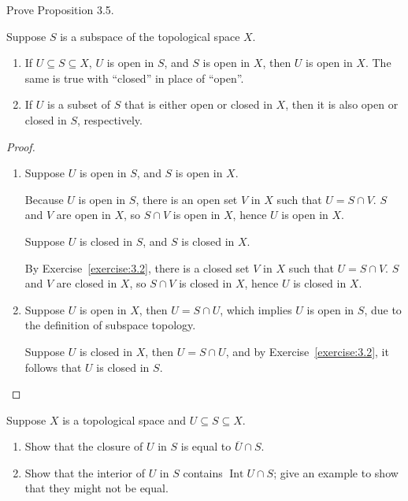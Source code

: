 \begin{exercise}{3.6}
	Prove Proposition 3.5.

	Suppose $S$ is a subspace of the topological space $X$.
	\begin{enumerate}[label={(\alph*)}]
		\item If $U\subseteq S\subseteq X$, $U$ is open in $S$, and $S$ is open in $X$, then $U$ is open in $X$. The same is true with ``closed'' in place of ``open''.
		\item If $U$ is a subset of $S$ that is either open or closed in $X$, then it is also open or closed in $S$, respectively.
	\end{enumerate}
\end{exercise}

\begin{proof}
	\begin{enumerate}[label={(\alph*)}]
		\item Suppose $U$ is open in $S$, and $S$ is open in $X$.

		      Because $U$ is open in $S$, there is an open set $V$ in $X$ such that $U = S\cap V$. $S$ and $V$ are open in $X$, so $S\cap V$ is open in $X$, hence $U$ is open in $X$.

		      Suppose $U$ is closed in $S$, and $S$ is closed in $X$.

		      By Exercise~\ref{exercise:3.2}, there is a closed set $V$ in $X$ such that $U = S\cap V$. $S$ and $V$ are closed in $X$, so $S\cap V$ is closed in $X$, hence $U$ is closed in $X$.
		\item Suppose $U$ is open in $X$, then $U = S\cap U$, which implies $U$ is open in $S$, due to the definition of subspace topology.

		      Suppose $U$ is closed in $X$, then $U = S\cap U$, and by Exercise~\ref{exercise:3.2}, it follows that $U$ is closed in $S$.
	\end{enumerate}
\end{proof}

\begin{exercise}{3.7}\label{exercise:3.7}
	Suppose $X$ is a topological space and $U\subseteq S\subseteq X$.
	\begin{enumerate}[label={(\alph*)}]
		\item Show that the closure of $U$ in $S$ is equal to $\overline{U}\cap S$.
		\item Show that the interior of $U$ in $S$ contains $\operatorname{Int}U\cap S$; give an example to show that they might not be equal.
	\end{enumerate}
\end{exercise}

